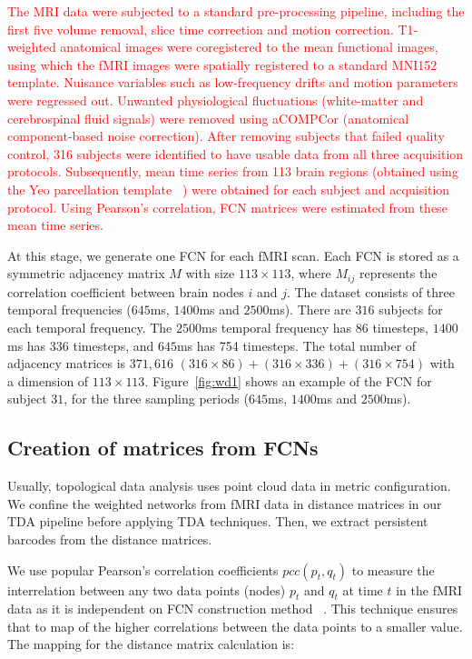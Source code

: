 \textcolor{red}{
The MRI data were subjected to a standard pre-processing pipeline, including the first five volume removal, slice time correction and motion correction. T1-weighted anatomical images were coregistered to the mean functional images, using which the fMRI images were spatially registered to a standard MNI152 template. Nuisance variables such as low-frequency drifts and motion parameters were regressed out. Unwanted physiological fluctuations (white-matter and cerebrospinal fluid signals) were removed using aCOMPCor (anatomical component-based noise correction). After removing subjects that failed quality control, 316 subjects were identified to have usable data from all three acquisition protocols. Subsequently, mean time series from 113 brain regions (obtained using the Yeo parcellation template ~\cite{thomas2011organization}) were obtained for each subject and acquisition protocol.
Using Pearson’s correlation, FCN matrices were estimated from these mean time series. 
}

At this stage, we generate one FCN for each fMRI scan. Each FCN is stored as a symmetric adjacency matrix $M$ with size $113 \times 113$, where $M_{ij}$ represents the correlation coefficient between brain nodes $i$ and $j$. The dataset consists of three temporal frequencies ($645$ms, $1400$ms and $2500$ms). There are $316$ subjects for each temporal frequency. The $2500$ms temporal frequency has 86 timesteps, $1400$ms has 336 timesteps, and $645$ms has 754 timesteps. The total number of adjacency matrices is $371,616$ $(316 \times 86) + (316 \times 336) + (316 \times 754)$ with a dimension of $113 \times 113$. Figure~\ref{fig:wd1} shows an example of the FCN for subject $31$, for the three sampling periods ($645$ms, $1400$ms and $2500$ms).


\subsection{Creation of matrices from FCNs}
\label{sec:fcn_to_ms}

Usually, topological data analysis uses point cloud data in metric configuration. We confine the weighted networks from fMRI data in distance matrices in our TDA pipeline before applying TDA techniques. Then, we extract persistent barcodes from the distance matrices. 


We use popular Pearson’s correlation coefficients $pcc(p_t, q_t)$ to measure the interrelation between any two data points (nodes) $p_t$ and $q_t$ at time $t$ in the fMRI data as it is independent on FCN construction method ~\cite{smith2011network}. This technique ensures that to map of the higher correlations between the data points to a smaller value. The mapping for the distance matrix calculation is:

